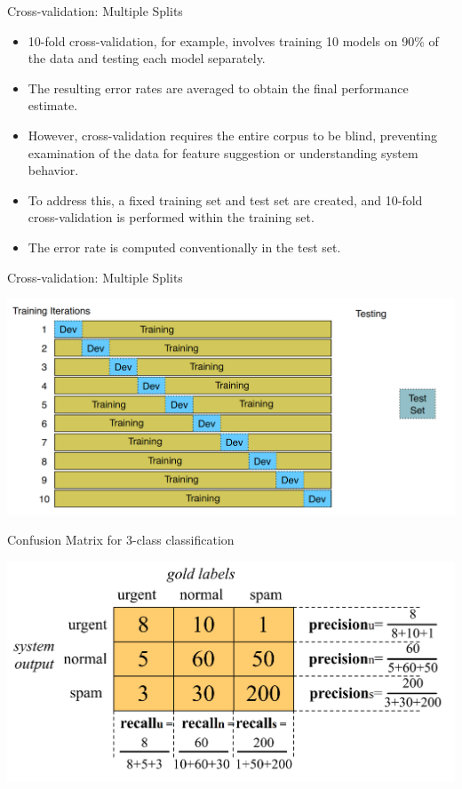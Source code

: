 \documentclass[handout]{beamer}
\begin{document}
\begin{frame}{Cross-validation: Multiple Splits}
\scriptsize
\begin{itemize}
\item 10-fold cross-validation, for example, involves training 10 models on 90\% of the data and testing each model separately.
\item The resulting error rates are averaged to obtain the final performance estimate.
\item However, cross-validation requires the entire corpus to be blind, preventing examination of the data for feature suggestion or understanding system behavior.
\item To address this, a fixed training set and test set are created, and 10-fold cross-validation is performed within the training set.
\item The error rate is computed conventionally in the test set.
\end{itemize}
\end{frame}


\begin{frame}{Cross-validation: Multiple Splits}
\scriptsize 

\begin{center}
\includegraphics[scale=0.28]{pics/cv.png}
\end{center}

\end{frame}


\begin{frame}{Confusion Matrix for 3-class classification}


\begin{center}
\includegraphics[scale=0.23]{pics/confmatrix.png}
\end{center}

\end{frame}
\end{document}
